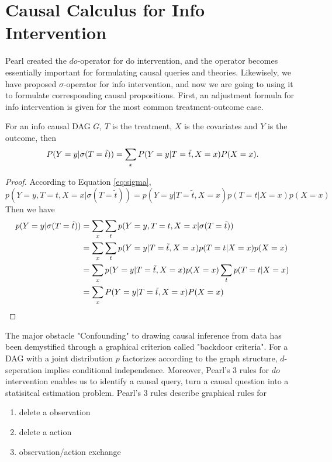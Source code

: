 \section{Causal Calculus for Info Intervention}

Pearl created the $do$-operator for do intervention, and the operator becomes essentially important for formulating causal queries and theories. Likewisely, we have proposed $\sigma$-operator for info intervention, and now we are going to using it to formulate corresponding causal propositions.  First, an adjustment formula for info intervention is given for the most common treatment-outcome case. 
 
 \begin{Thm}
 	For an info causal DAG $G$, $T$ is the treatment, $X$ is the covariates and $Y$ is the outcome, then
 	$$
 	P(Y=y|\mathrm{\sigma}(T=\tilde{t})) = \sum_x P(Y=y|T=\tilde{t}, X=x) P(X=x).
	$$
 \end{Thm}
 

\begin{proof}
	According to Equation \ref{eq:sigma},
 	$$
 	p(Y=y, T=t, X=x|\sigma(T=\tilde{t})) = p(Y=y|T=\tilde{t}, X=x) p(T=t|X=x) p(X=x) 
 	$$
 	Then we have
 	\begin{align*}
 		p(Y=y|\mathrm{\sigma}(T=\tilde{t})) &= \sum_x \sum_t p(Y=y, T=t, X=x|\sigma(T=\tilde{t})) \\
 											&= \sum_x \sum_t p(Y=y|T=\tilde{t}, X=x) p(T=t|X=x) p(X=x) \\
 											&= \sum_x p(Y=y|T=\tilde{t}, X=x) p(X=x) \sum_t p(T=t|X=x) \\
 											&= \sum_x P(Y=y|T=\tilde{t}, X=x) P(X=x) \\
 	\end{align*}
\end{proof}

The major obstacle "Confounding" to drawing causal inference from data has been demystified through a graphical criterion called "backdoor criteria". For a DAG with a joint distribution  $p$  factorizes according to the graph structure, $d$-seperation implies conditional independence.  Moreover, Pearl's 3 rules for $do$ intervention enables us to identify a causal query, turn a causal question into a statisitcal estimation problem. Pearl's 3 rules describe graphical rules for
\begin{enumerate}[1)]
	\setlength{\itemsep}{0em}
	\item delete a observation
	\item delete a action 
	\item observation/action exchange
\end{enumerate}

